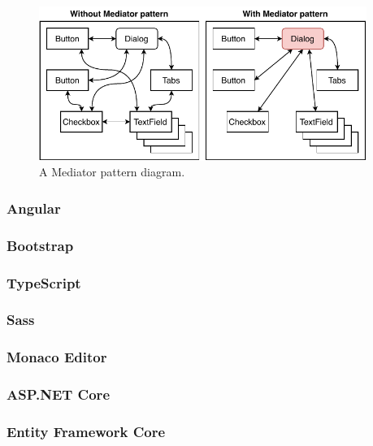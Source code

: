 \begin{figure}[h]
    \centering
    \includegraphics[width=0.95\textwidth]{images/mediator_pattern.pdf}
    \caption{A Mediator pattern diagram.}
    \label{fig:mediator_pattern}
\end{figure}


\subsubsection{Angular}

\subsubsection{Bootstrap}

\subsubsection{TypeScript}

\subsubsection{Sass}

\subsubsection{Monaco Editor}


\subsubsection{ASP.NET Core}

\subsubsection{Entity Framework Core}

